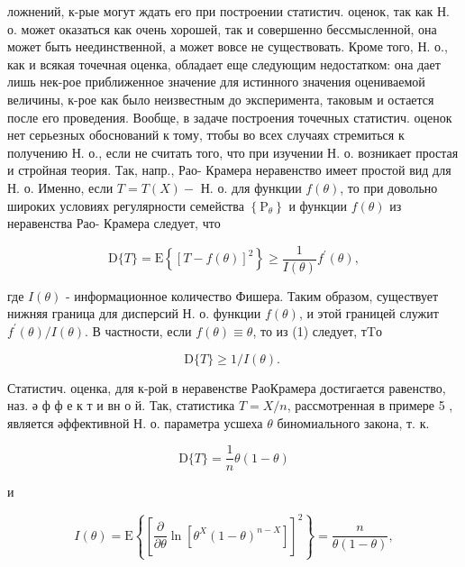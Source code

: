\documentclass[10pt]{article}
\begin{document}
ложнений, к-рые могут ждать его при построении статистич. оценок, так как Н. о. может оказаться как очень хорошей, так и совершенно бессмысленной, она может быть неединственной, а может вовсе не существовать. Кроме того, Н. о., как и всякая точечная оценка, обладает еще следующим недостатком: она дает лишь нек-рое приближенное значение для истинного значения оцениваемой величины, к-рое как было неизвестным до эксперимента, таковым и остается после его проведения. Вообще, в задаче построения точечных статистич. оценок нет серьезных обоснований к тому, ттобы во всех случаях стремиться к получению Н. о., если не считать того, что при изучении Н. о. возникает простая и стройная теория. Так, напр., Рао- Крамера неравенство имеет простой вид для Н. о. Именно, если $T=T(X)-$ Н. о. для функции $f(\theta)$, то при довольно широких условиях регулярности семейства $\left\{\mathrm{P}_{\theta}\right\}$ и функции $f(\theta)$ из неравенства Рао- Крамера следует, что



\[

\mathrm{D}\{T\}=\mathrm{E}\left\{[T-f(\theta)]^{2}\right\} \geqslant \frac{1}{I(\theta)} f^{\prime}(\theta),

\]



где $I(\theta)$ - информационное количество Фишера. Таким образом, существует нижняя граница для дисперсий Н. о. функции $f(\theta)$, и этой границей служит $f^{\prime}(\theta) / I(\theta)$. В частности, если $f(\theta) \equiv \theta$, то из (1) следует, тTо



\[

\mathrm{D}\{T\} \geqslant 1 / I(\theta) \text {. }

\]



Статистич. оценка, для к-рой в неравенстве РаоКрамера достигается равенство, наз. ә ф ф е к т и вн о й. Так, статистика $T=X / n$, рассмотренная в примере 5 , является әффективной $Н$. о. параметра усшеха $\theta$ биномиального закона, т. к.



\[

\mathrm{D}\{T\}=\frac{1}{n} \theta(1-\theta)

\]



и



\[

I(\theta)=\mathrm{E}\left\{\left[\frac{\partial}{\partial \theta} \ln \left[\theta^{X}(1-\theta)^{n-X}\right]\right]^{2}\right\}=\frac{n}{\theta(1-\theta)},

\]
\end{document}
